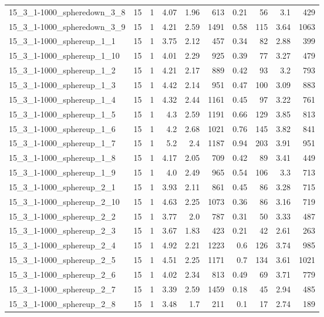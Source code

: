 \begin{center}
\begin{scriptsize}
\begin{longtable}{lrrrrrrrrr}
15\_3\_1-1000\_spheredown\_3\_8 & 15 & 1 & 4.07 & 1.96 & 613 & 0.21 & 56 & 3.1 & 429\\
15\_3\_1-1000\_spheredown\_3\_9 & 15 & 1 & 4.21 & 2.59 & 1491 & 0.58 & 115 & 3.64 & 1063\\
15\_3\_1-1000\_sphereup\_1\_1 & 15 & 1 & 3.75 & 2.12 & 457 & 0.34 & 82 & 2.88 & 399\\
15\_3\_1-1000\_sphereup\_1\_10 & 15 & 1 & 4.01 & 2.29 & 925 & 0.39 & 77 & 3.27 & 479\\
15\_3\_1-1000\_sphereup\_1\_2 & 15 & 1 & 4.21 & 2.17 & 889 & 0.42 & 93 & 3.2 & 793\\
15\_3\_1-1000\_sphereup\_1\_3 & 15 & 1 & 4.42 & 2.14 & 951 & 0.47 & 100 & 3.09 & 883\\
15\_3\_1-1000\_sphereup\_1\_4 & 15 & 1 & 4.32 & 2.44 & 1161 & 0.45 & 97 & 3.22 & 761\\
15\_3\_1-1000\_sphereup\_1\_5 & 15 & 1 & 4.3 & 2.59 & 1191 & 0.66 & 129 & 3.85 & 813\\
15\_3\_1-1000\_sphereup\_1\_6 & 15 & 1 & 4.2 & 2.68 & 1021 & 0.76 & 145 & 3.82 & 841\\
15\_3\_1-1000\_sphereup\_1\_7 & 15 & 1 & 5.2 & 2.4 & 1187 & 0.94 & 203 & 3.91 & 951\\
15\_3\_1-1000\_sphereup\_1\_8 & 15 & 1 & 4.17 & 2.05 & 709 & 0.42 & 89 & 3.41 & 449\\
15\_3\_1-1000\_sphereup\_1\_9 & 15 & 1 & 4.0 & 2.49 & 965 & 0.54 & 106 & 3.3 & 713\\
15\_3\_1-1000\_sphereup\_2\_1 & 15 & 1 & 3.93 & 2.11 & 861 & 0.45 & 86 & 3.28 & 715\\
15\_3\_1-1000\_sphereup\_2\_10 & 15 & 1 & 4.63 & 2.25 & 1073 & 0.36 & 86 & 3.16 & 719\\
15\_3\_1-1000\_sphereup\_2\_2 & 15 & 1 & 3.77 & 2.0 & 787 & 0.31 & 50 & 3.33 & 487\\
15\_3\_1-1000\_sphereup\_2\_3 & 15 & 1 & 3.67 & 1.83 & 423 & 0.21 & 42 & 2.61 & 263\\
15\_3\_1-1000\_sphereup\_2\_4 & 15 & 1 & 4.92 & 2.21 & 1223 & 0.6 & 126 & 3.74 & 985\\
15\_3\_1-1000\_sphereup\_2\_5 & 15 & 1 & 4.51 & 2.25 & 1171 & 0.7 & 134 & 3.61 & 1021\\
15\_3\_1-1000\_sphereup\_2\_6 & 15 & 1 & 4.02 & 2.34 & 813 & 0.49 & 69 & 3.71 & 779\\
15\_3\_1-1000\_sphereup\_2\_7 & 15 & 1 & 3.39 & 2.59 & 1459 & 0.18 & 45 & 2.94 & 485\\
15\_3\_1-1000\_sphereup\_2\_8 & 15 & 1 & 3.48 & 1.7 & 211 & 0.1 & 17 & 2.74 & 189\\

\end{longtable}
\end{scriptsize}
\end{center}
